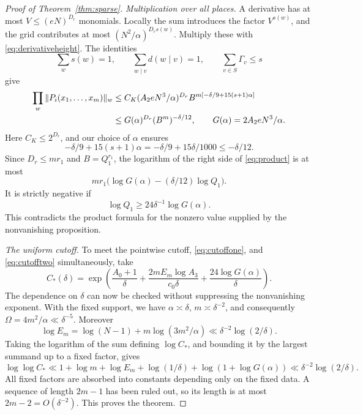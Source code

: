 \documentclass[11pt]{article}
\numberwithin{equation}{section}
\theoremstyle{remark}\newtheorem{remark}[theorem]{Remark}
\begin{document}
\begin{proof}[Proof of Theorem~\ref{thm:sparse}]
\emph{Multiplication over all places.}
A derivative has at most $V\le(eN)^{D_r}$ monomials. Locally the sum
introduces the factor $V^{s(w)}$, and the grid contributes at most
$(N^2/\alpha)^{D_rs(w)}$. Multiply these with
\eqref{eq:derivativeheight}. The identities
\[
 \sum_ws(w)=1,\qquad \sum_{w\mid v}d(w\mid v)=1,
 \qquad\sum_{v\in S}\Gamma_v\le s
\]
give
\begin{align}
 \prod_w\|P_i(x_1,\ldots,x_m)\|_w
 &\le C_K(A_2eN^3/\alpha)^{D_r}
       B^{m[-\delta/9+15(s+1)\alpha]}\notag\\
 &\le G(\alpha)^{D_r}(B^m)^{-\delta/12},
       \qquad G(\alpha)=2A_2eN^3/\alpha.
       \label{eq:product}
\end{align}
Here $C_K\le2^{D_r}$, and our choice of $\alpha$ ensures
\[
 -\delta/9+15(s+1)\alpha
 =-\delta/9+15\delta/1000\le-\delta/12.
\]
Since $D_r\le mr_1$ and $B=Q_1^{r_1}$, the logarithm of the right
side of \eqref{eq:product} is at most
\[
 mr_1\bigl(\log G(\alpha)-(\delta/12)\log Q_1\bigr).
\]
It is strictly negative if
\begin{equation}\label{eq:cutofftwo}
 \log Q_1\ge24\delta^{-1}\log G(\alpha).
\end{equation}
This contradicts the product formula for the nonzero value supplied
by the nonvanishing proposition.

\emph{The uniform cutoff.}
To meet the pointwise cutoff, \eqref{eq:cutoffone}, and
\eqref{eq:cutofftwo} simultaneously, take
\begin{equation}\label{eq:explicitcutoff}
 C_*(\delta)=\exp\left(
 \frac{A_0+1}{\delta}
 +\frac{2mE_m\log A_3}{c_0\delta}
 +\frac{24\log G(\alpha)}{\delta}\right).
\end{equation}
The dependence on $\delta$ can now be checked without suppressing
the nonvanishing exponent. With the fixed support, we have
$\alpha\asymp\delta$, $m\asymp\delta^{-2}$, and consequently
$\Omega=4m^2/\alpha\ll\delta^{-5}$. Moreover
\begin{equation}\label{eq:nonvanishingexponent}
 \log E_m=\log(N-1)+m\log(3m^2/\alpha)
 \ll\delta^{-2}\log(2/\delta).
\end{equation}
Taking the logarithm of the sum defining $\log C_*$, and bounding
it by the largest summand up to a fixed factor, gives
\[
 \log\log C_*
 \ll1+\log m+\log E_m+\log(1/\delta)
          +\log(1+\log G(\alpha))
 \ll\delta^{-2}\log(2/\delta).
\]
All fixed factors are absorbed into constants depending only on the
fixed data. A sequence of length $2m-1$ has been ruled out, so its
length is at most $2m-2=O(\delta^{-2})$. This proves the theorem.
\end{proof}
\end{document}
